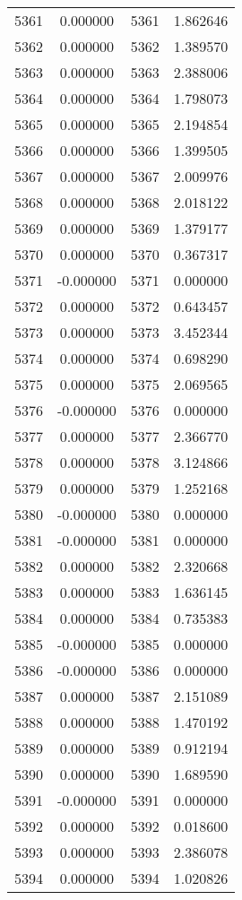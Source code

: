 \documentclass[12pt]{article}
\begin{document}
\begin{longtable}{@{}cccc@{}}
5361 & 0.000000 & 5361 & 1.862646 \\
5362 & 0.000000 & 5362 & 1.389570 \\
5363 & 0.000000 & 5363 & 2.388006 \\
5364 & 0.000000 & 5364 & 1.798073 \\
5365 & 0.000000 & 5365 & 2.194854 \\
5366 & 0.000000 & 5366 & 1.399505 \\
5367 & 0.000000 & 5367 & 2.009976 \\
5368 & 0.000000 & 5368 & 2.018122 \\
5369 & 0.000000 & 5369 & 1.379177 \\
5370 & 0.000000 & 5370 & 0.367317 \\
5371 & -0.000000 & 5371 & 0.000000 \\
5372 & 0.000000 & 5372 & 0.643457 \\
5373 & 0.000000 & 5373 & 3.452344 \\
5374 & 0.000000 & 5374 & 0.698290 \\
5375 & 0.000000 & 5375 & 2.069565 \\
5376 & -0.000000 & 5376 & 0.000000 \\
5377 & 0.000000 & 5377 & 2.366770 \\
5378 & 0.000000 & 5378 & 3.124866 \\
5379 & 0.000000 & 5379 & 1.252168 \\
5380 & -0.000000 & 5380 & 0.000000 \\
5381 & -0.000000 & 5381 & 0.000000 \\
5382 & 0.000000 & 5382 & 2.320668 \\
5383 & 0.000000 & 5383 & 1.636145 \\
5384 & 0.000000 & 5384 & 0.735383 \\
5385 & -0.000000 & 5385 & 0.000000 \\
5386 & -0.000000 & 5386 & 0.000000 \\
5387 & 0.000000 & 5387 & 2.151089 \\
5388 & 0.000000 & 5388 & 1.470192 \\
5389 & 0.000000 & 5389 & 0.912194 \\
5390 & 0.000000 & 5390 & 1.689590 \\
5391 & -0.000000 & 5391 & 0.000000 \\
5392 & 0.000000 & 5392 & 0.018600 \\
5393 & 0.000000 & 5393 & 2.386078 \\
5394 & 0.000000 & 5394 & 1.020826 \\

\end{longtable}
\end{document}

